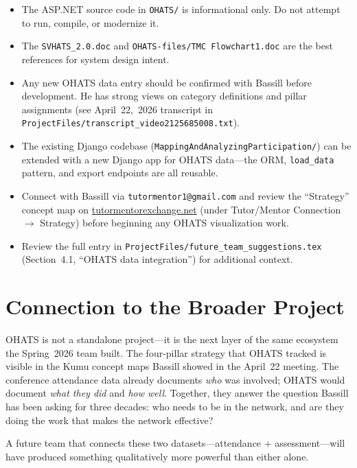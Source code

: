 \documentclass[12pt]{article}
\begin{document}
\begin{itemize}[leftmargin=1.5em]
  \item The ASP.NET source code in \texttt{OHATS/} is informational only.
        Do not attempt to run, compile, or modernize it.
  \item The \texttt{SVHATS\_2.0.doc} and \texttt{OHATS-files/TMC~Flowchart1.doc}
        are the best references for system design intent.
  \item Any new OHATS data entry should be confirmed with Bassill
        before development. He has strong views on category definitions
        and pillar assignments (see April~22,~2026 transcript in
        \texttt{ProjectFiles/transcript\_video2125685008.txt}).
  \item The existing Django codebase (\texttt{MappingAndAnalyzingParticipation/})
        can be extended with a new Django app for OHATS data---the ORM,
        \texttt{load\_data} pattern, and export endpoints are all reusable.
  \item Connect with Bassill via \texttt{tutormentor1@gmail.com} and review
        the ``Strategy'' concept map on
        \href{https://tutormentorexchange.net}{tutormentorexchange.net}
        (under Tutor/Mentor Connection $\to$ Strategy) before beginning
        any OHATS visualization work.
  \item Review the full entry in \texttt{ProjectFiles/future\_team\_suggestions.tex}
        (Section~4.1, ``OHATS data integration'') for additional context.
\end{itemize}

\section{Connection to the Broader Project}

OHATS is not a standalone project---it is the next layer of the same
ecosystem the Spring~2026 team built. The four-pillar strategy that OHATS
tracked is visible in the Kumu concept maps Bassill showed in the April~22
meeting. The conference attendance data already documents \emph{who} was
involved; OHATS would document \emph{what they did} and \emph{how well}.
Together, they answer the question Bassill has been asking for three decades:
who needs to be in the network, and are they doing the work that makes the
network effective?

A future team that connects these two datasets---attendance + assessment---will
have produced something qualitatively more powerful than either alone.
\end{document}
